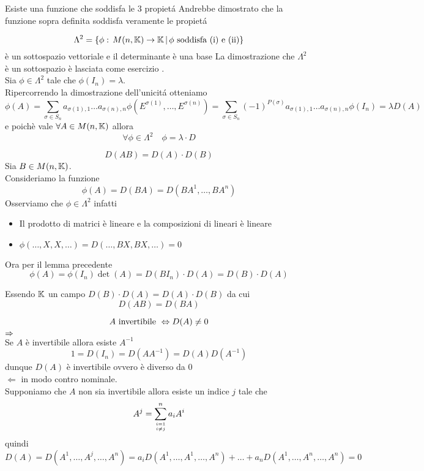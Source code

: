 \spazio 
\begin{prop}[Esistenza]\bianco
Esiste una funzione che soddisfa le 3 propiet\'a 
\proof Andrebbe dimostrato che la funzione sopra definita soddisfa veramente le propiet\'a

\end{prop}
\spazio 
\begin{lem}
$$ \Lambda^2 =\{ \phi:\, M(n, \mathbb{K}) \to \mathbb{K} \, \vert \, \phi \text{ soddisfa (i) e (ii)} \}$$
\`e un sottospazio vettoriale e il determinante \`e una base 
\proof La dimostrazione che $\Lambda^2$ \`e un sottospazio \`e lasciata come esercizio .\\
Sia $\phi \in \Lambda^2 $ tale che $\phi (I_n )= \lambda $.\\
Ripercorrendo la dimostrazione dell'unicit\'a otteniamo
$$ \phi(A)=\sum_{\sigma \in S_n} a_{\sigma(1),1}\dots a_{\sigma(n),n} \phi \left( E^{\sigma(1)} , \dots , E ^{\sigma(n)} \right)= \sum_{\sigma \in S_n} (-1)^{P(\sigma)} a_{\sigma(1),1}\dots a_{\sigma(n),n} \phi \left( I_n \right) = \lambda D(A)$$
e poich\`e vale $\forall A \in M(n,\mathbb{K})$ allora
$$  \forall \phi \in \Lambda^2 \quad \phi = \lambda \cdot D $$
\endproof
\end{lem}
\begin{prop}
$$ D(AB)=D(A)\cdot D(B)$$
\proof Sia $B\in M(n,\mathbb{K})$.\\
Consideriamo la funzione 
$$ \phi(A) = D (BA) = D(BA^1, \dots, BA^n)$$
Osserviamo che $ \phi \in \Lambda^2 $ infatti
\begin{itemize}
\item Il prodotto di matrici \`e lineare e la composizioni di lineari \`e lineare
\item $\phi(\dots, X ,X, \dots) = D ( \dots, BX, BX, \dots) = 0$
\end{itemize}
Ora per il lemma precedente
$$ \phi (A)= \phi (I_n) \det (A) = D \left( B I_n \right) \cdot D(A) = D(B)\cdot D(A)$$
\endproof
\begin{oss}Essendo $\mathbb{K}$ un campo $ D(B) \cdot D(A)= D(A)\cdot D(B)$ da cui 
$$ D(AB)=D(BA)$$
\end{oss}
\end{prop}
\spazio
\begin{cor}
$$ A \text{ invertibile } \Leftrightarrow D(A) \neq 0 $$
\proof $\Rightarrow$ \\
Se $A$ \`e invertibile allora esiste $A^{-1}$
$$1=D(I_n)= D  \left( A A^{-1}\right) = D(A) D\left( A^{-1} \right)$$
dunque $D(A)$ \`e invertibile ovvero \`e diverso da $0$\\ 
$\Leftarrow$ in modo contro nominale.\\
Supponiamo che $A$ non sia invertibile allora esiste un indice $j$ tale che
$$ A^j = \sum_{ i=1  \atop{i\neq j }}^n a_i A^i $$
quindi 
$$D(A)= D \left( A^1 , \dots, A^j , \dots, A^n \right) =a_i D(A^1,\dots, A^1 , \dots, A^n ) + \dots + a_n D(A^1, \dots, A^n , \dots, A^n ) =0$$
\endproof
\end{cor}
